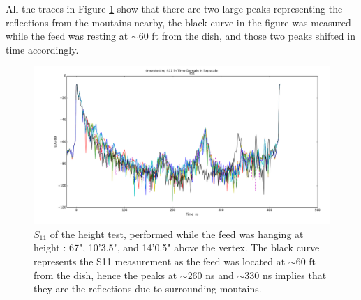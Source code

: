 \documentclass[preprint]{aastex}  %
\begin{document}
All the traces in Figure \ref{Fig:moutain} show that there are two large peaks representing the reflections from the moutains nearby, the black curve in the figure was measured while the feed was resting at $\sim$60 ft from the dish, and those two peaks shifted in time accordingly.
\begin{figure}[H]
	\begin{center}
	\includegraphics[width =.7\textwidth]{./reflectometry_plots/Mar28/s11all-mar28mix17set1}
	\caption{$S_{11}$ of the height test, performed while the feed was hanging at height : 67", 
10'3.5", and 14'0.5" above the vertex. The black curve represents the S11 measurement as the 
feed was located at $\sim$60 ft from the dish, hence the peaks at $\sim$260 ns and 
$\sim$330 ns implies that they are the reflections due to surrounding moutains.
\label{Fig:moutain} }
	\end{center}
\end{figure}
\clearpage
\end{document}

